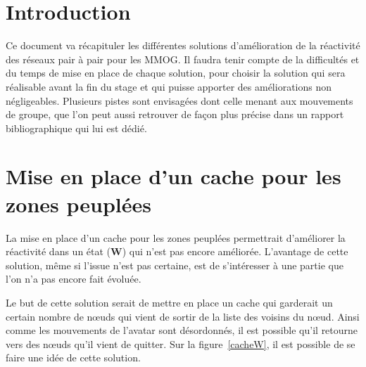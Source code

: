 \documentclass[11pt,a4paper]{article}
\begin{document}

\newpage
\tableofcontents
\newpage



\section{Introduction}
Ce document va récapituler les différentes solutions d'amélioration de la réactivité des réseaux pair à pair pour les MMOG. Il faudra tenir compte de la difficultés et du temps de mise en place de chaque solution, pour choisir la solution qui sera réalisable avant la fin du stage et qui puisse apporter des améliorations non négligeables.
Plusieurs pistes sont envisagées dont celle menant aux mouvements de groupe, que l'on peut aussi retrouver de façon plus précise dans un rapport bibliographique qui lui est dédié.

\newpage
\section{Mise en place d'un cache pour les zones peuplées}
La mise en place d'un cache pour les zones peuplées permettrait d'améliorer la réactivité dans un état (\textbf{W}) qui n'est pas encore améliorée. L'avantage de cette solution, même si l'issue n'est pas certaine, est de s'intéresser à une partie que l'on n'a pas encore fait évoluée. 
\par Le but de cette solution serait de mettre en place un cache qui garderait un certain nombre de nœuds qui vient de sortir de la liste des voisins du nœud. Ainsi comme les mouvements de l'avatar sont désordonnés, il est possible qu'il retourne vers des nœuds qu'il vient de quitter. Sur la figure~\ref{cacheW}, il est possible de se faire une idée de cette solution.
\end{document}
